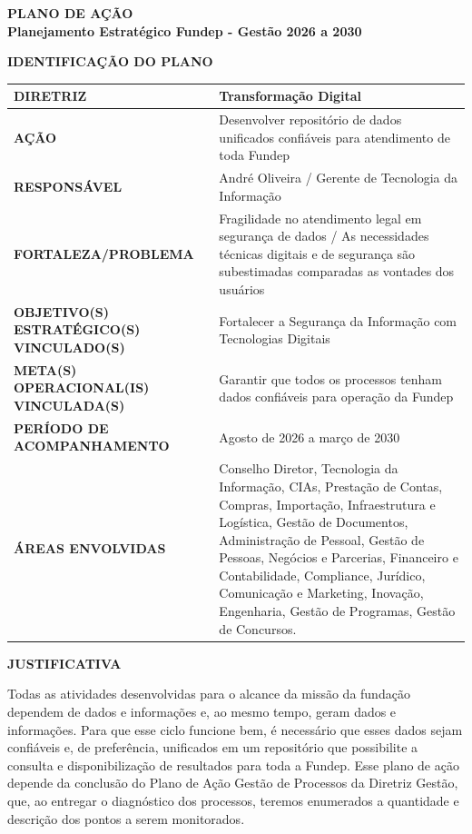 \documentclass[12pt,a4paper]{article}
\newcommand{\secao}[1]{%
  \par\vspace{6pt}%
  {\noindent\bfseries\color{azulTitulo}\fontsize{13}{16}\selectfont #1}%
  \par\vspace{2pt}%
}
\begin{document}
\thispagestyle{empty}

\begin{center}
  {\bfseries\color{azulTitulo}\fontsize{17}{20}\selectfont PLANO DE AÇÃO}\\[6pt]
  {\bfseries\color{azulTitulo}\fontsize{13}{16}\selectfont Planejamento Estratégico Fundep - Gestão 2026 a 2030}
\end{center}

\secao{IDENTIFICAÇÃO DO PLANO}

\begingroup
\small
{}
\renewcommand{\arraystretch}{1.35}
\begin{tabular}{|>{\cellcolor{azulClaro}\bfseries}p{}|p{}|}
\hline
DIRETRIZ & Transformação Digital \\
\hline
AÇÃO & Desenvolver repositório de dados unificados confiáveis para atendimento de toda Fundep \\
\hline
RESPONSÁVEL & André Oliveira / Gerente de Tecnologia da Informação \\
\hline
FORTALEZA/PROBLEMA & Fragilidade no atendimento legal em segurança de dados / As necessidades técnicas digitais e de segurança são subestimadas comparadas as vontades dos usuários \\
\hline
OBJETIVO(S) ESTRATÉGICO(S) VINCULADO(S) & Fortalecer a Segurança da Informação com Tecnologias Digitais \\
\hline
META(S) OPERACIONAL(IS) VINCULADA(S) & Garantir que todos os processos tenham dados confiáveis para operação da Fundep \\
\hline
PERÍODO DE ACOMPANHAMENTO & Agosto de 2026 a março de 2030 \\
\hline
ÁREAS ENVOLVIDAS & Conselho Diretor, Tecnologia da Informação, CIAs, Prestação de Contas, Compras, Importação, Infraestrutura e Logística, Gestão de Documentos, Administração de Pessoal, Gestão de Pessoas, Negócios e Parcerias, Financeiro e Contabilidade, Compliance, Jurídico, Comunicação e Marketing, Inovação, Engenharia, Gestão de Programas, Gestão de Concursos. \\
\hline
\end{tabular}
\endgroup

\secao{JUSTIFICATIVA}

Todas as atividades desenvolvidas para o alcance da missão da fundação dependem de dados e informações e, ao mesmo tempo, geram dados e informações. Para que esse ciclo funcione bem, é necessário que esses dados sejam confiáveis e, de preferência, unificados em um repositório que possibilite a consulta e disponibilização de resultados para toda a Fundep. Esse plano de ação depende da conclusão do Plano de Ação Gestão de Processos da Diretriz Gestão, que, ao entregar o diagnóstico dos processos, teremos enumerados a quantidade e descrição dos pontos a serem monitorados.
\end{document}
